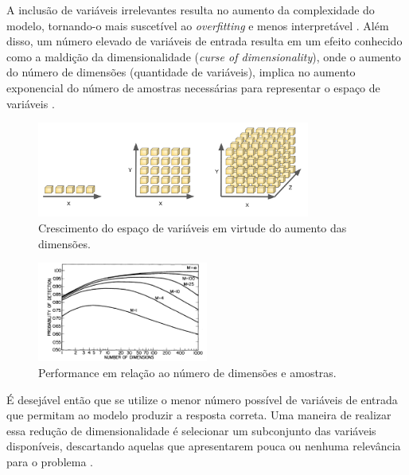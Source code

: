 A inclusão de variáveis irrelevantes resulta no aumento da complexidade do modelo, tornando-o mais suscetível ao \textit{overfitting} e menos interpretável \cite[p. 204]{intro_stat_learn}. Além disso, um número elevado de variáveis de entrada resulta em um efeito conhecido como a maldição da dimensionalidade (\textit{curse of dimensionality}), onde o aumento do número de dimensões (quantidade de variáveis), implica no aumento exponencial do número de amostras necessárias para representar o espaço de variáveis \cite[p. 34]{bishop_2006}.

\begin{figure}[!htb]
    \caption{Crescimento do espaço de variáveis em virtude do aumento das dimensões.}
    \begin{center}    
    \includegraphics[width=0.8\textwidth]{imgs/rev/dimensionalty_grown.png}
    \end{center}
    \label{fig:dim_grown}
\end{figure}

\begin{figure}[!htb]
    \caption{Performance em relação ao número de dimensões e amostras.}
    \begin{center}  
    \includegraphics[width=0.5\textwidth]{imgs/rev/dim_performance}
    \end{center}
    \label{fig:dim_perf}
\end{figure}

É desejável então que se utilize o menor número possível de variáveis de entrada que permitam ao modelo produzir a resposta correta. Uma maneira de realizar essa redução de dimensionalidade é selecionar um subconjunto das variáveis disponíveis, descartando aquelas que apresentarem pouca ou nenhuma relevância para o problema \cite[p. 204]{intro_stat_learn}.


